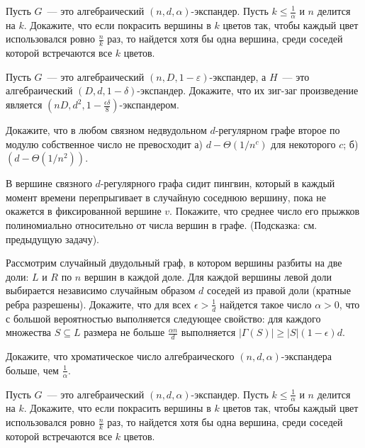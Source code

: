\setcounter{curtask}{8}



\begin{task}
    Пусть $G$~--- это алгебраический $(n, d, \alpha)$-экспандер. Пусть
    $k \le \frac{1}{\alpha}$ и $n$ делится на $k$. Докажите, что если покрасить
    вершины в $k$ цветов так, чтобы каждый цвет использовался ровно $\frac{n}{k}$
    раз, то найдется хотя бы одна вершина, среди соседей которой встречаются все $k$
    цветов.
\end{task}

\begin{task}
	Пусть $G$~--- это алгебраический $(n,D, 1-\varepsilon)$-экспандер, а $H$~--- это
    алгебраический $(D, d, 1-\delta)$-экспандер. Докажите, что их зиг-заг
    произведение является $(nD, d^2, 1 - \frac{\epsilon \delta}{8})$-экспандером.
\end{task}

\begin{task}
	Докажите, что в любом связном недвудольном $d$-регулярном графе второе по модулю
	собственное число не превосходит а) $d - \Theta(1 / n^c)$ для некоторого $c$;
	б) $(d - \Theta(1 / n^2))$.
\end{task}

\begin{task}
	В вершине связного $d$-регулярного графа сидит пингвин, который в каждый момент
	времени перепрыгивает в случайную соседнюю вершину, пока не окажется в
    фиксированной вершине $v$. Покажите, что среднее число его прыжков полиномиально
    относительно от числа вершин в графе. (Подсказка: см. предыдущую задачу).
\end{task}

\breakline

\begin{ptask}{5}
    Рассмотрим случайный двудольный граф, в котором вершины разбиты на две доли: $L$
	и $R$ по $n$ вершин в каждой доле. Для каждой вершины левой доли выбирается
	независимо случайным образом $d$ соседей из правой доли (кратные ребра
	разрешены). Докажите, что для всех $\epsilon > \frac{1}{d}$ найдется такое число
	$\alpha>0$, что с большой вероятностью выполняется следующее свойство: для
    каждого множества $S \subseteq L$ размера не больше $\frac{\alpha n}{d}$
    выполняется $|\Gamma(S)| \ge |S|(1 - \epsilon)d$.
\end{ptask}

\begin{ptask}{6}
    Докажите, что хроматическое число алгебраического $(n,d,\alpha)$-экспандера
    больше, чем $\frac{1}{\alpha}$.
\end{ptask}

\begin{ptask}{7}
    Пусть $G$~--- это алгебраический $(n,d,\alpha)$-экспандер. Пусть 
	$k\le \frac{1}{\alpha}$ и $n$ делится на $k$. Докажите, что если покрасить
    вершины  в $k$ цветов так, чтобы каждый цвет использовался ровно $\frac{n}{k}$
	раз, то найдется хотя бы одна вершина, среди соседей которой встречаются все $k$
    цветов.
\end{ptask}